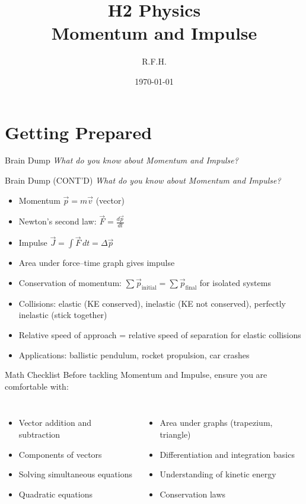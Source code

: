 \documentclass[11pt]{beamer}
\title{H2 Physics \\ Momentum and Impulse}
\author{R.F.H.}
\date{\today}
\begin{document}
\begin{frame}
\titlepage
\end{frame}

\section{Getting Prepared}

\begin{frame}[shrink=15]{Brain Dump}
\centering
\Large
\textit{What do you know about Momentum and Impulse?}
\vfill
\end{frame}

\begin{frame}[shrink=15]{Brain Dump (CONT'D)}
\centering
\Large
\textit{What do you know about Momentum and Impulse?}
\vfill
\begin{itemize}
    \item Momentum $\vec{p} = m\vec{v}$ (vector)
    \item Newton's second law: $\vec{F} = \frac{d\vec{p}}{dt}$
    \item Impulse $\vec{J} = \int \vec{F}\,dt = \Delta\vec{p}$
    \item Area under force–time graph gives impulse
    \item Conservation of momentum: $\sum \vec{p}_{\text{initial}} = \sum \vec{p}_{\text{final}}$ for isolated systems
    \item Collisions: elastic (KE conserved), inelastic (KE not conserved), perfectly inelastic (stick together)
    \item Relative speed of approach = relative speed of separation for elastic collisions
    \item Applications: ballistic pendulum, rocket propulsion, car crashes
\end{itemize}
\end{frame}

\begin{frame}{Math Checklist}
Before tackling Momentum and Impulse, ensure you are comfortable with:
\begin{columns}[T]
\begin{itemize}
    \item Vector addition and subtraction
    \item Components of vectors
    \item Solving simultaneous equations
    \item Quadratic equations
\end{itemize}
\begin{itemize}
    \item Area under graphs (trapezium, triangle)
    \item Differentiation and integration basics
    \item Understanding of kinetic energy
    \item Conservation laws
\end{itemize}
\end{columns}
\end{frame}
\end{document}
